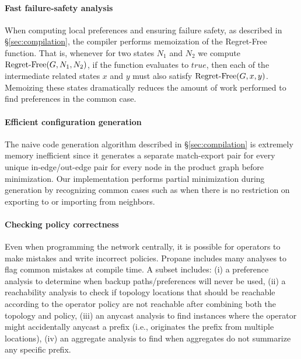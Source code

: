 \documentclass[10pt]{sigalternate052015}
\newcommand{\sysname}{{\small \sf Propane}\xspace}
\newcommand{\para}[1]{\paragraph*{\textbf{#1}}}
\begin{document}


\para{Fast failure-safety analysis}

When computing local preferences and ensuring failure safety, as described in \S\ref{sec:compilation}, the compiler performs memoization of the \textup{Regret-Free} function. That is, whenever for two states $N_1$ and $N_2$ we compute $\textup{Regret-Free}(G, N_1, N_2)$, if the function evaluates to $true$, then each of the intermediate related states $x$ and $y$ must also satisfy $\textup{Regret-Free}(G, x, y)$. Memoizing these states dramatically reduces the amount of work performed to find preferences in the common case.

\para{Efficient configuration generation}

The naive code generation algorithm described in \S\ref{sec:compilation} is extremely memory inefficient since it generates a separate match-export pair for every unique in-edge/out-edge pair for every node in the product graph before minimization. Our implementation performs partial minimization during generation by recognizing common cases such as when there is no restriction on exporting to or importing from neighbors.


\para{Checking policy correctness}

Even when programming the network centrally, it is possible for operators to make mistakes and write incorrect policies.
\sysname includes many analyses to flag common mistakes at compile time. A subset includes: (i) a preference analysis to determine when backup paths/preferences will never be used, (ii) a reachability analysis to check if topology locations that should be reachable according to the operator policy are not reachable after combining both the topology and policy, (iii) an anycast analysis to find instances where the operator might accidentally anycast a prefix (i.e., originates the prefix from multiple locations), (iv) an aggregate analysis to find when aggregates do not summarize any specific prefix.
\end{document}
